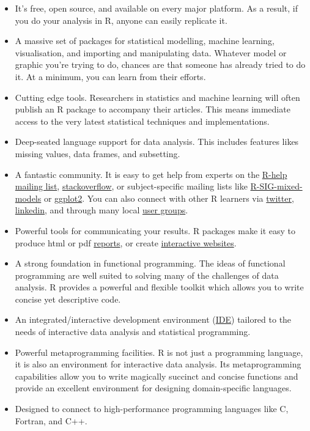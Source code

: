 \begin{itemize}
\item
  It's free, open source, and available on every major platform. As a
  result, if you do your analysis in R, anyone can easily replicate it.
\item
  A massive set of packages for statistical modelling, machine learning,
  visualisation, and importing and manipulating data. Whatever model or
  graphic you're trying to do, chances are that someone has already
  tried to do it. At a minimum, you can learn from their efforts.
\item
  Cutting edge tools. Researchers in statistics and machine learning
  will often publish an R package to accompany their articles. This
  means immediate access to the very latest statistical techniques and
  implementations.
\item
  Deep-seated language support for data analysis. This includes features
  likes missing values, data frames, and subsetting.
\item
  A fantastic community. It is easy to get help from experts on the
  \href{https://stat.ethz.ch/mailman/listinfo/r-help}{R-help mailing
  list},
  \href{http://stackoverflow.com/questions/tagged/r}{stackoverflow}, or
  subject-specific mailing lists like
  \href{https://stat.ethz.ch/mailman/listinfo/r-sig-mixed-models}{R-SIG-mixed-models}
  or \href{https://groups.google.com/forum/\#!forum/ggplot2}{ggplot2}.
  You can also connect with other R learners via
  \href{https://twitter.com/search?q=\%23rstats}{twitter},
  \href{http://www.linkedin.com/groups/R-Project-Statistical-Computing-77616}{linkedin},
  and through many local
  \href{http://blog.revolutionanalytics.com/local-r-groups.html}{user
  groups}.
\item
  Powerful tools for communicating your results. R packages make it easy
  to produce html or pdf \href{http://yihui.name/knitr/}{reports}, or
  create \href{http://www.rstudio.com/shiny/}{interactive websites}.
\item
  A strong foundation in functional programming. The ideas of functional
  programming are well suited to solving many of the challenges of data
  analysis. R provides a powerful and flexible toolkit which allows you
  to write concise yet descriptive code.
\item
  An integrated/interactive development environment
  (\href{http://www.rstudio.com/ide/}{IDE}) tailored to the needs of
  interactive data analysis and statistical programming.
\item
  Powerful metaprogramming facilities. R is not just a programming
  language, it is also an environment for interactive data analysis. Its
  metaprogramming capabilities allow you to write magically succinct and
  concise functions and provide an excellent environment for designing
  domain-specific languages.
\item
  Designed to connect to high-performance programming languages like C,
  Fortran, and C++.
\end{itemize}

